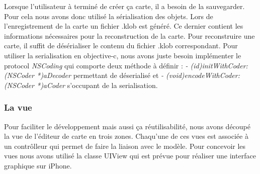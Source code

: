 		Lorsque l'utilisateur à terminé de créer ça carte, il a besoin de la sauvegarder. Pour cela nous avons donc utilisé la sérialisation des objets. Lors de l'enregistrement de la carte un fichier \og .klob \fg  est généré. Ce dernier contient les informations nécessaires pour la reconstruction de la carte. Pour reconstruire une carte, il suffit de désérialiser le contenu du fichier \og .klob \fg correspondant. Pour utiliser la serialisation en 
		\gls{objective-c}, nous avons juste besoin
		 implémenter le protocol \textit{NSCoding} qui comporte deux méthode à définir : 
		\textit{- (id)initWithCoder:(NSCoder *)aDecoder} permettant de déserialisé et \textit{- (void)encodeWithCoder:(NSCoder *)aCoder} s'occupant de la serialisation.
	
	\subsubsection{La vue}
		Pour faciliter le développement mais aussi ça réutilisabilité, nous avons découpé la vue de l'éditeur de carte en trois zones. Chaqu'une de ces vues est associée à un contrôlleur qui permet de faire la liaison avec le modèle. Pour concevoir les vues nous avons utilisé la classe UIView qui est prévue pour réaliser une interface graphique sur iPhone. 
			
